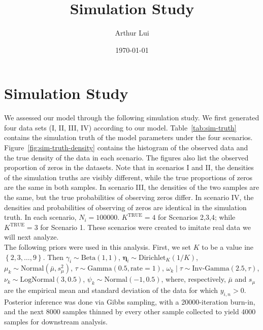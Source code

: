 \documentclass[12pt]{article} %
\title{Simulation Study}
\author{Arthur Lui}
\date{\today} %
\newcommand{\bc}[1]{\left\{#1\right\}}
\newcommand{\Beta}{\text{Beta}}
\newcommand{\Dirichlet}{\text{Dirichlet}}
\newcommand{\G}{\text{Gamma}}
\newcommand{\InvGamma}{\text{Inv-Gamma}}
\newcommand{\LogNormal}{\text{LogNormal}}
\newcommand{\Normal}{\text{Normal}}
\newcommand{\true}{\text{TRUE}}
\begin{document}
\maketitle

\section{Simulation Study}
We assessed our model through the following simulation study. We first
generated four data sets (I, II, III, IV) according to our model.
Table~\ref{tab:sim-truth} contains the simulation truth of the model
parameters under the four scenarios. Figure~\ref{fig:sim-truth-density}
contains the histogram of the observed data and the true density of the data
in each scenario. The figures also list the observed proportion of zeros in
the datasets. Note that in scenarios I and II, the densities of the
simulation truths are visibly different, while the true proportions of zeros
are the same in both samples. In scenario III, the densities of the two
samples are the same, but the true probabilities of observing zeros differ.
In scenario IV, the densities and probabilities of observing of zeros are
identical in the simulation truth. In each scenario, $N_i=100000$.
$K^\true=4$ for Scenarios 2,3,4; while $K^\true=3$ for Scenario 1. These
scenarios were created to imitate real data we will next analyze. \\

The following priors were used in this analysis. First, we set $K$ to be a
value ine $\bc{2,3,\dots,9}$. Then $\gamma_i\sim\Beta(1, 1)$,
$\bm\eta_i\sim\Dirichlet_K(1/K)$, $\mu_k\sim\Normal(\bar{\mu}, s_\mu^2)$,
$\tau\sim\G(0.5,\text{rate}=1)$, $\omega_k\mid\tau\sim\InvGamma(2.5, \tau)$,
$\nu_k\sim\LogNormal(3, 0.5)$, $\psi_k\sim\Normal(-1, 0.5)$, where,
respectively, $\bar{\mu}$ and $s_\mu$ are the empirical mean and standard
deviation of the data for which $y_{i,n} > 0$. Posterior inference was done
via Gibbs sampling, with a 20000-iteration burn-in, and the next 8000
samples thinned by every other sample collected to yield 4000 samples for
downstream analysis.
\end{document}
